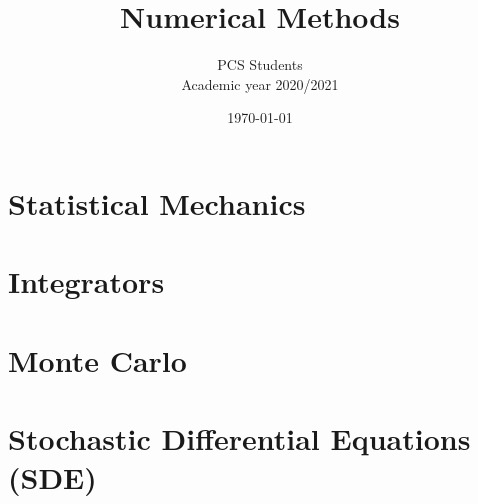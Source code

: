 \documentclass[a4paper]{report} %
\title{Numerical Methods}
\author{PCS Students \\ Academic year 2020/2021}
\date{\today}
\begin{document}
\par

\maketitle
\tableofcontents

\chapter{Statistical Mechanics}
    
    
    
    
\chapter{Integrators}
    
    
    
    
\chapter{Monte Carlo}
    
    
    
\chapter{Stochastic Differential Equations (SDE)}
    
    
    
\end{document}

